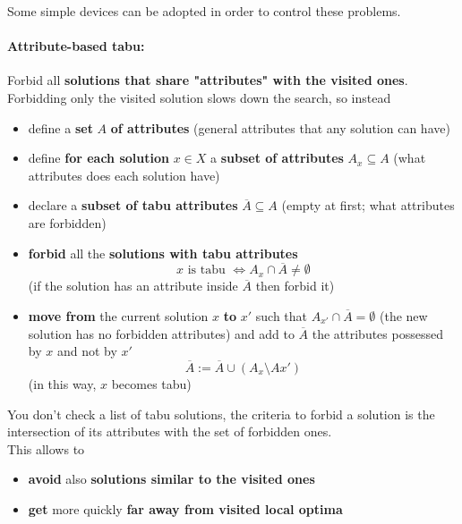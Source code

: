 Some simple devices can be adopted in order to control these problems.\\

\paragraph{Attribute-based tabu:} Forbid all \textbf{solutions that share "attributes" with the visited ones}.\\

Forbidding only the visited solution slows down the search, so instead
\begin{itemize}
	\item define a \textbf{set} $A$ \textbf{of attributes} (general attributes that any solution can have)
	
	\item define \textbf{for each solution} $x \in X$ a \textbf{subset of attributes} $A_x \subseteq A$ (what attributes does each solution have)
	
	\item declare a \textbf{subset of tabu attributes} $\overline{A} \subseteq A$ (empty at first; what attributes are forbidden)
	
	\item \textbf{forbid} all the \textbf{solutions with tabu attributes}
	$$ x \text{ is tabu } \Leftrightarrow A_x \cap \overline{A} \neq \emptyset $$
	(if the solution has an attribute inside $\overline{A}$ then forbid it)
	
	\item \textbf{move from} the current solution $x$ \textbf{to} $x'$ such that $A_{x'} \cap \overline{A} = \emptyset$ (the new solution has no forbidden attributes) and add to $\overline{A}$ the attributes possessed by $x$ and not by $x'$
	$$ \overline{A} := \overline{A} \cup (A_x \setminus A{x'} ) $$
	(in this way, $x$ becomes tabu)
\end{itemize}
You don't check a list of tabu solutions, the criteria to forbid a solution is the intersection of its attributes with the set of forbidden ones.\\

This allows to
\begin{itemize}
	\item \textbf{avoid} also \textbf{solutions similar to the visited ones}
	\item \textbf{get} more quickly \textbf{far away from visited local optima}
\end{itemize}

